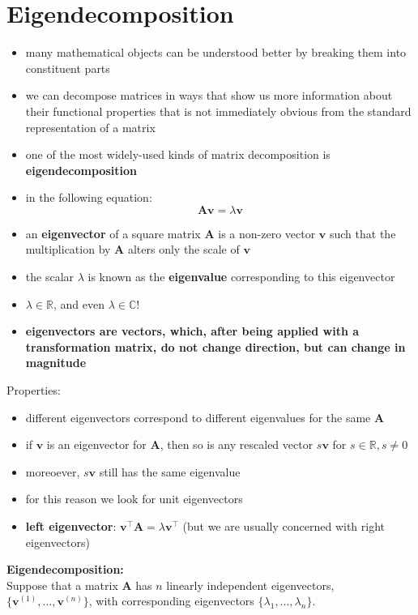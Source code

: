 \documentclass[11pt,twocolumn]{report}
\def\realnumbers{\mathbb{R}}
\def\complexnumbers{\mathbb{C}}
\begin{document}
\section{Eigendecomposition}
\begin{itemize}
  \item many mathematical objects can be understood better by breaking them
    into constituent parts
  \item we can decompose matrices in ways that show us more information about
    their functional properties that is not immediately obvious from the
    standard representation of a matrix
  \item one of the most widely-used kinds of matrix decomposition is
    \textbf{eigendecomposition}
  \item in the following equation:
    \begin{equation}
      \label{eigendecomposition}
      \bm{Av} = \lambda\bm{v}
    \end{equation}
  \item an \textbf{eigenvector} of a square matrix $\bm{A}$ is a non-zero
    vector $\bm{v}$ such that the multiplication by $\bm{A}$ alters only the
    scale of $\bm{v}$
  \item the scalar $\lambda$ is known as the \textbf{eigenvalue} corresponding
    to this eigenvector
  \item $\lambda \in \realnumbers$, and even $\lambda \in \complexnumbers$!
  \item \textbf{eigenvectors are vectors, which, after being applied with a
      transformation matrix, do not change direction, but can change in
      magnitude}
\end{itemize}
Properties:
\begin{itemize}
  \item different eigenvectors correspond to different eigenvalues for the same
    $\bm{A}$
  \item if $\bm{v}$ is an eigenvector for $\bm{A}$, then so is any rescaled
    vector $s\bm{v}$ for $s \in \realnumbers, s \neq 0$
  \item moreoever, $s\bm{v}$ still has the same eigenvalue
  \item for this reason we look for unit eigenvectors
  \item \textbf{left eigenvector}: $\bm{v}^\intercal\bm{A} =
    \lambda\bm{v}^\intercal$ (but we are usually concerned with right
    eigenvectors)
\end{itemize}
\textbf{Eigendecomposition:}\\
Suppose that a matrix $\bm{A}$ has $n$ linearly independent eigenvectors,
$\{\bm{v}^{(1)},...,\bm{v}^{(n)}\}$, with corresponding eigenvectors
$\{\lambda_1,...,\lambda_n\}$.
\end{document}
